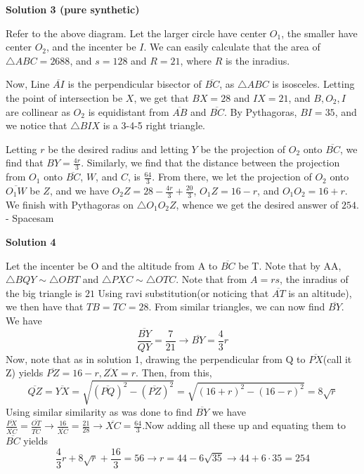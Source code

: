 \begin{enumerate}
 



\textbf{Solution 3 (pure synthetic)}

Refer to the above diagram. Let the larger circle have center $O_1$, the smaller have center $O_2$, and the incenter be $I$. We can easily calculate that the area of $\triangle ABC = 2688$, and $s = 128$ and $R = 21$, where $R$ is the inradius. 

 Now, Line $\overline{AI}$ is the perpendicular bisector of $\overline{BC}$, as $\triangle ABC$ is isosceles. Letting the point of intersection be $X$, we get that $BX = 28$ and $IX = 21$, and $B, O_2, I$ are collinear as $O_2$ is equidistant from $\overline{AB}$ and $\overline{BC}$. By Pythagoras, $BI = 35$, and we notice that $\triangle BIX$ is a 3-4-5 right triangle. 

 Letting $r$ be the desired radius and letting $Y$ be the projection of $O_2$ onto $\overline{BC}$, we find that $BY = \frac{4r}{3}$. Similarly, we find that the distance between the projection from $O_1$ onto $\overline{BC}$, $W$, and $C$, is $\frac{64}{3}$. From there, we let the projection of $O_2$ onto $\overline{O_1W}$ be $Z$, and we have $O_2Z = 28 - \frac{4r}{3} + \frac{20}{3}$, $O_1Z = 16 - r$, and $O_1O_2 = 16 + r$. We finish with Pythagoras on $\triangle O_1O_2Z$, whence we get the desired answer of $\boxed{254}$. - Spacesam

 



\textbf{Solution 4}

Let the incenter be O and the altitude from A to $\overline{BC}$ be T. Note that by AA, $\triangle BQY \sim \triangle OBT$ and $\triangle PXC \sim \triangle OTC.$ Note that from $A = rs$, the inradius of the big triangle is $21$ Using ravi substitution(or noticing that $\overline{AT}$ is an altitude), we then have that $TB = TC = 28.$ From similar triangles, we can now find $\overline{BY}.$ We have 
 \[\frac{\overline{BY}}{QY} = \frac{7}{{21}} \rightarrow \overline{BY} = \frac{4}{3} r\] Now, note that as in solution 1, drawing the perpendicular from Q to $\overline{PX}$(call it Z) yields $\overline{PZ} = 16 - r, \overline{ZX} = r.$ Then, from this, 
 \[\overline{QZ} = \overline{YX} = \sqrt{(\overline{PQ})^2 - (\overline{PZ})^2} = \sqrt{(16+r)^2-(16-r)^2} = 8\sqrt{r}\] Using similar similarity as was done to find $\overline{BY}$ we have $\frac{\overline{PX}}{\overline{XC}} = \frac{\overline{OT}}{\overline{TC}} \rightarrow \frac{16}{\overline{XC}} = \frac{21}{28} \rightarrow \overline{XC} = \frac{64}{3}$.Now adding all these up and equating them to $\overline{BC}$ yields 
 \[\frac{4}{3}r + 8\sqrt{r}+ \frac{16}{3} = 56 \rightarrow r = 44 - 6\sqrt{35} \rightarrow 44 + 6\cdot 35 = \boxed{254}\]




\end{enumerate}
